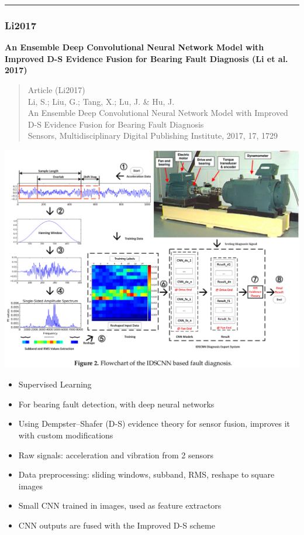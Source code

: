 \documentclass[
  letterpaper,
  DIV=11,
  numbers=noendperiod]{scrartcl}
\providecommand{\tightlist}{%
  \setlength{\itemsep}{0pt}\setlength{\parskip}{0pt}}\usepackage{longtable,booktabs,array}
\begin{document}
\begin{center}\rule{0.5\linewidth}{0.5pt}\end{center}

\hypertarget{li2017}{%
\subsubsection{Li2017}\label{li2017}}

\textbf{An Ensemble Deep Convolutional Neural Network Model with
Improved D-S Evidence Fusion for Bearing Fault Diagnosis (Li et al.
2017)}

\begin{quote}
Article (Li2017)\\
Li, S.; Liu, G.; Tang, X.; Lu, J. \& Hu, J.\\
An Ensemble Deep Convolutional Neural Network Model with Improved D-S
Evidence Fusion for Bearing Fault Diagnosis\\
Sensors, Multidisciplinary Digital Publishing Institute, 2017, 17, 1729
\end{quote}

\includegraphics{img/2023-01-08-19-37-45.png}

\begin{itemize}
\tightlist
\item
  Supervised Learning
\item
  For bearing fault detection, with deep neural networks
\item
  Using Dempster--Shafer (D-S) evidence theory for sensor fusion,
  improves it with custom modifications
\item
  Raw signals: acceleration and vibration from 2 sensors
\item
  Data preprocessing: sliding windows, subband, RMS, reshape to square
  images
\item
  Small CNN trained in images, used as feature extractors
\item
  CNN outputs are fused with the Improved D-S scheme
\end{itemize}
\end{document}

